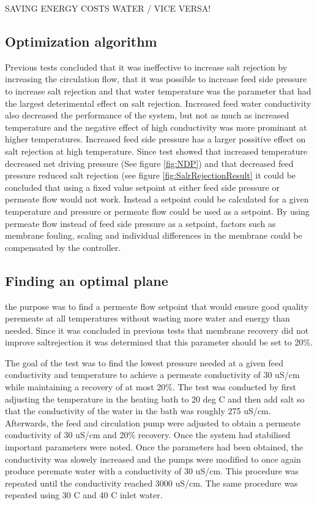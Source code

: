 SAVING ENERGY COSTS WATER / VICE VERSA!


 
\newpage
\subsection{Optimization algorithm}

Previous tests concluded that it was ineffective to increase salt rejection by increasing the circulation flow, that it was possible to increase feed side pressure to increase salt rejection and that water temperature was the parameter that had the largest deterimental effect on salt rejection. Increased feed water conductivity also decreased the performance of the system, but not as much as increased temperature and the negative effect of high conductivity was more prominant at higher temperatures. Increased feed side pressure has a larger possitive effect on salt rejection at high temperature.
Since test showed that increased temperature decreased net driving pressure (See figure \ref{fig:NDP}) and that decreased feed pressure reduced salt rejection (see figure \ref{fig:SalrRejectionResult} it could be concluded that using a fixed value setpoint at either feed side pressure or permeate flow would not work. Instead a setpoint could be calculated for a given temperature and pressure or permeate flow could be used as a setpoint.
By using permeate flow instead of feed side pressure as a setpoint, factors such as membrane fouling, scaling and individual differences in the membrane could be compensated by the controller.

\subsection{Finding an optimal plane}

the purpose was to find a permeate flow setpoint that would ensure good quality peremeate at all temperatures without wasting more water and energy than needed. Since it was concluded in previous tests that membrane recovery did not improve saltrejection it was determined that this parameter should be set to 20\%. 

The goal of the test was to find the lowest pressure needed at a given feed conductivity and temperature to achieve a permeate conductivity of 30 uS/cm while maintaining a recovery of at most 20\%. The test was conducted by first adjusting the temperature in the heating bath to 20 deg C and then add salt so that the conductivity of the water in the bath was roughly 275 uS/cm. Afterwards, the feed and circulation pump were adjusted to obtain a  permeate conductivity of 30 uS/cm and 20\% recovery. Once the system had stabilised important parameters were noted. Once the parameters had been obtained, the conductivity was slowely increased and the pumps were modified to once again produce peremate water with a conductivity of 30 uS/cm. This procedure was repeated until the conductivity reached 3000 uS/cm. The same procedure was repeated using 30 C and 40 C inlet water.








